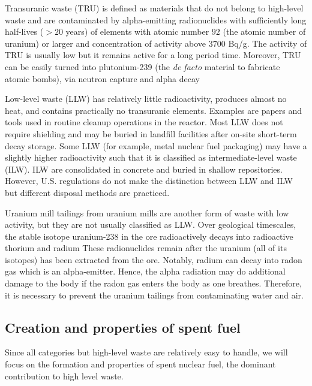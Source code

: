 \documentclass[nofootinbib,preprint,aps]{revtex4-1}
\begin{document}
    Transuranic waste (TRU) is defined as materials that do not belong to high-level waste and are
    contaminated by alpha-emitting radionuclides with
    sufficiently long half-lives ($>20$ years) of elements with atomic number $92$ (the atomic number of uranium)
    or larger and concentration of activity above $3700$ Bq/g.\cite{j83,s01} The activity
    of TRU is usually low but it remains active for a long period time. Moreover, TRU can be easily turned
    into plutonium-239 (the {\it de facto} material to fabricate atomic bombs), via neutron capture and alpha decay

    Low-level waste (LLW) has relatively little radioactivity, produces almost no heat,
    and contains practically no
    transuranic elements. Examples are papers and tools used in routine cleanup operations in the reactor.
    Most LLW does not require shielding and may be buried in landfill 
    facilities after on-site short-term decay storage.
    Some LLW (for example, metal nuclear fuel packaging) may have a slightly
    higher radioactivity such that it is classified
    as intermediate-level waste (ILW). ILW are consolidated in concrete and buried in shallow
    repositories.\cite{s01} However, U.S. regulations do not make the distinction
    between LLW and ILW but different disposal methods are practiced.\cite{nrc09, s01}

    Uranium mill tailings from uranium mills are another form of waste with low activity, but
    they are not usually classified as LLW.
    Over geological timescales, the stable isotope uranium-238 
    in the ore radioactively decays into radioactive thorium and radium 
    These radionuclides remain after the uranium (all of its isotopes)
    has been extracted from the ore. Notably, radium
    can decay into radon gas which is an alpha-emitter. Hence, the alpha radiation may do additional
    damage to the body if the radon gas enters the body as one breathes.
    Therefore, it is necessary to prevent the uranium tailings
    from contaminating water and air.
    \subsection{Creation and properties of spent fuel}
    \label{sec:waste:spentfuel}
    Since all categories but high-level waste are relatively easy to handle,
    we will focus on the formation and
    properties of spent nuclear fuel, the dominant contribution to high level waste.
\end{document}
